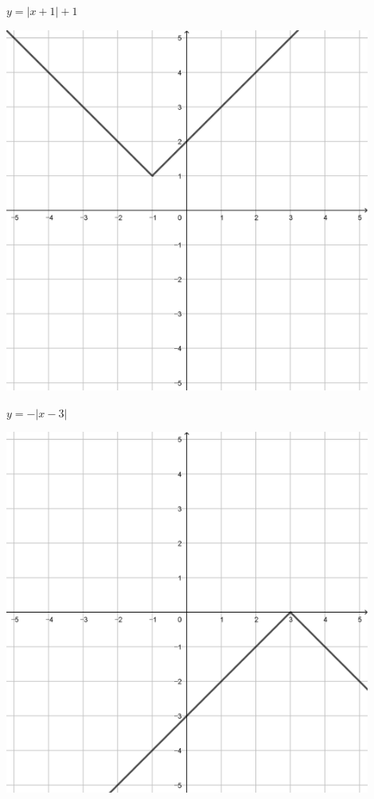 \documentclass[a4paper]{oblivoir}
\begin{document}
\begin{minipage}{0.45\textwidth}\centering
\(y=|x+1|+1\)
\par\bigskip\includegraphics[width=0.9\textwidth]{img/3_piecewise_21}
\end{minipage}
\begin{minipage}{0.45\textwidth}\centering
\(y=-|x-3|\)
\par\bigskip\includegraphics[width=0.9\textwidth]{img/3_piecewise_22}
\end{minipage}\bigskip\bigskip\par
\end{document}
